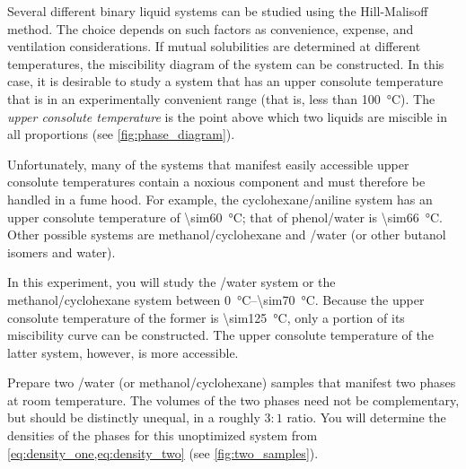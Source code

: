 Several different binary liquid systems can be studied using the Hill-Malisoff method. 
The choice depends on such factors as convenience, expense, and ventilation considerations. 
If mutual solubilities are determined at different temperatures, the miscibility diagram of the system can be constructed. 
In this case, it is desirable to study a system that has an upper consolute temperature that is in an experimentally convenient range (that is, less than \qty{100}{\degreeCelsius}). The \emph{upper consolute temperature} is the point above which two liquids are miscible in all proportions (see \cref{fig:phase_diagram}). 

Unfortunately, many of the systems that manifest easily accessible upper consolute temperatures contain a noxious component and must therefore be handled in a fume hood. 
For example, the cyclohexane/aniline system has an upper consolute temperature of \qty{\sim60}{\degreeCelsius}; that of phenol/water is \qty{\sim66}{\degreeCelsius}. Other possible systems are methanol/cyclohexane and /water (or other butanol isomers and water). 

In this experiment, you will study the /water system or the methanol/cyclohexane system between \qtyrange{0}{\sim70}{\degreeCelsius}. 
Because the upper consolute temperature of the former is \qty{\sim125}{\degreeCelsius}, only a portion of its miscibility curve can be constructed. 
The upper consolute temperature of the latter system, however, is more accessible. 

Prepare two /water (or methanol/cyclohexane) samples that manifest two phases at room temperature. 
The volumes of the two phases need not be complementary, but should be distinctly unequal, in a roughly \(3{:}1\) ratio. 
You will determine the densities of the phases for this unoptimized system from \cref{eq:density_one,eq:density_two} (see \cref{fig:two_samples}). 

